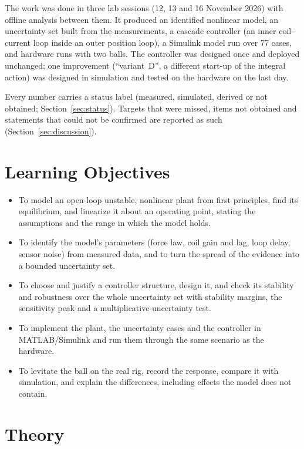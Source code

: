 \documentclass[11pt,a4paper]{article}
\begin{document}
The work was done in three lab sessions (12, 13 and 16 November 2026) with offline analysis between them. It
produced an identified nonlinear model, an uncertainty set built from the measurements, a cascade controller
(an inner coil-current loop inside an outer position loop), a Simulink model run over 77 cases, and hardware runs with
two balls. The controller was designed once and deployed unchanged; one improvement (``variant~D'', a different
start-up of the integral action) was designed in simulation and tested on the hardware on the last day.

Every number carries a status label (measured, simulated, derived or not obtained; Section~\ref{sec:status}). Targets
that were missed, items not obtained and statements that could not be confirmed are reported as such
(Section~\ref{sec:discussion}).

\section{Learning Objectives}
\label{sec:objectives}
\begin{itemize}
\item To model an open-loop unstable, nonlinear plant from first principles, find its equilibrium, and linearize it
      about an operating point, stating the assumptions and the range in which the model holds.
\item To identify the model's parameters (force law, coil gain and lag, loop delay, sensor noise) from measured data,
      and to turn the spread of the evidence into a bounded uncertainty set.
\item To choose and justify a controller structure, design it, and check its stability and robustness over the whole
      uncertainty set with stability margins, the sensitivity peak and a multiplicative-uncertainty test.
\item To implement the plant, the uncertainty cases and the controller in MATLAB/Simulink and run them through the same
      scenario as the hardware.
\item To levitate the ball on the real rig, record the response, compare it with simulation, and explain the
      differences, including effects the model does not contain.
\end{itemize}

\section{Theory}
\label{sec:theory}
\end{document}
